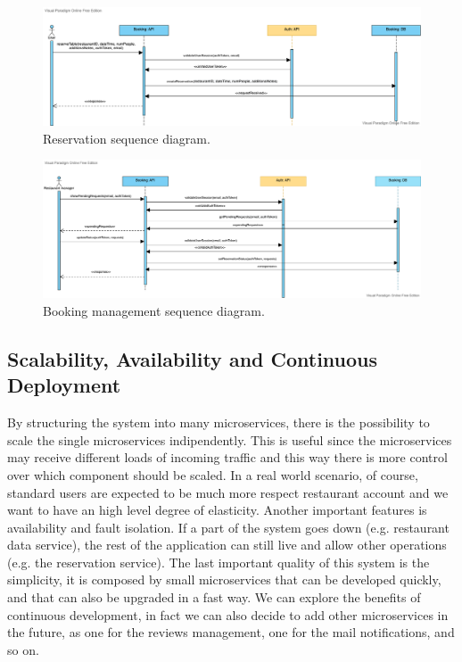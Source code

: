 \begin{figure}[h]
    \includegraphics[width=\linewidth]{../docs/sequence/booking/reserve.png}
    \caption{Reservation sequence diagram.}
    \label{fig:reserve}
\end{figure}

\begin{figure}[h]
    \includegraphics[width=\linewidth]{../docs/sequence/manageBooking/manageBooking.png}
    \caption{Booking management sequence diagram.}
    \label{fig:manage_booking}
\end{figure}

\subsection{Scalability, Availability and Continuous Deployment}

By structuring the system into many microservices, there is the possibility
to scale the single microservices indipendently. This is useful since the
microservices may receive different loads of incoming traffic and this
way there is more control over which component should be scaled. In a real world scenario, of course, standard users are expected to be much more respect restaurant account and we want to have an high level degree of elasticity.
Another important features is availability and fault isolation. If a part of the system goes down (e.g. restaurant data service), the rest of the application can still live and allow other operations (e.g. the reservation service).
The last important quality of this system is the simplicity, it is composed by small microservices that can be developed quickly, and that can also be upgraded in a fast way. We can explore the benefits of continuous development, in fact we can also decide to add other microservices in the future, as one for the reviews management, one for the mail notifications, and so on.
